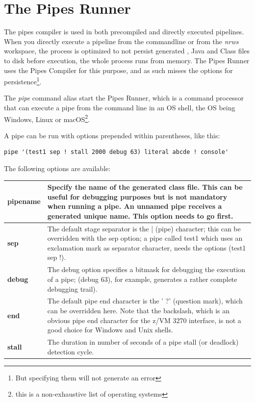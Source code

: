 \chapter{The Pipes Runner}
The pipes compiler is used in both precompiled and directly executed
pipelines. When you directly execute a pipeline from the commandline
or from the \emph{nrws} \nr{} workspace, the process is optimized to not persist
generated \nr{}, Java and Class files to disk before execution, the
whole process runs from memory. The Pipes Runner uses the Pipes
Compiler for this purpose, and as such misses the options for
persistence\footnote{But specifying them will not generate an error}.

The \emph{pipe} command alias start the Pipes Runner, which is a
command processor that can execute a pipe from the command line in an
OS shell, the OS being Windows, Linux or macOS\footnote{this is a
  non-exhaustive list of operating systems}.

A pipe can be run with options prepended within parentheses, like this:
\begin{lstlisting}
pipe '(test1 sep ! stall 2000 debug 63) literal abcde ! console'
\end{lstlisting}

The following options are
available:

\begin{tabularx}{\textwidth}{>{\bfseries}lX}
\toprule
pipename&Specify the name of the generated class file. This
can be useful for debugging purposes but is not mandatory when running
a pipe. An unnamed pipe receives a generated unique name. This option
needs to go first.
\\\midrule
sep&The default stage separator is the |
(pipe) character; this can be overridden with the sep option; a pipe
called test1 which uses an exclamation mark as separator character,
needs the options (test1 sep !).
\\\midrule
debug&The debug option specifies a bitmask for
debugging the execution of a pipe; (debug 63), for
example, generates a rather complete debugging trail).
\\\midrule
end&The default pipe end character is the ' ?'
  (question mark), which can be overridden here. Note that the
  backslash, which is an obvious pipe end character for the z/VM 3270
  interface, is not a good choice for Windows and Unix shells.
  \\\midrule
stall& The duration in number of seconds of a pipe stall (or deadlock)
detection cycle.
\\\bottomrule
\end{tabularx}



